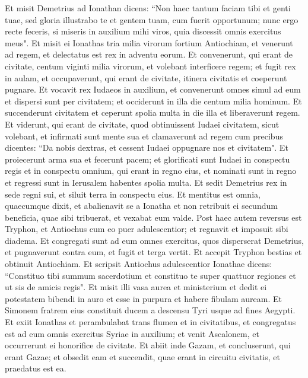 \begin{biblechapter}
\verse Et misit Demetrius ad Ionathan dicens: “Non haec tantum faciam tibi et genti tuae, sed gloria illustrabo te et gentem tuam, cum fuerit opportunum; 
\verse nunc ergo recte feceris, si miseris in auxilium mihi viros, quia discessit omnis exercitus meus". 
\verse Et misit ei Ionathas tria milia virorum fortium Antiochiam, et venerunt ad regem, et delectatus est rex in adventu eorum. 
\verse Et convenerunt, qui erant de civitate, centum viginti milia virorum, et volebant interficere regem; 
\verse et fugit rex in aulam, et occupaverunt, qui erant de civitate, itinera civitatis et coeperunt pugnare. 
\verse Et vocavit rex Iudaeos in auxilium, et convenerunt omnes simul ad eum et dispersi sunt per civitatem; et occiderunt in illa die centum milia hominum. 
\verse Et succenderunt civitatem et ceperunt spolia multa in die illa et liberaverunt regem. 
\verse Et viderunt, qui erant de civitate, quod obtinuissent Iudaei civitatem, sicut volebant, et infirmati sunt mente sua et clamaverunt ad regem cum precibus dicentes: 
\verse “Da nobis dextras, et cessent Iudaei oppugnare nos et civitatem". 
\verse Et proiecerunt arma sua et fecerunt pacem; et glorificati sunt Iudaei in conspectu regis et in conspectu omnium, qui erant in regno eius, et nominati sunt in regno et regressi sunt in Ierusalem habentes spolia multa. 
\verse Et sedit Demetrius rex in sede regni sui, et siluit terra in conspectu eius. 
\verse Et mentitus est omnia, quaecumque dixit, et abalienavit se a Ionatha et non retribuit ei secundum beneficia, quae sibi tribuerat, et vexabat eum valde. 
\verse Post haec autem reversus est Tryphon, et Antiochus cum eo puer adulescentior; et regnavit et imposuit sibi diadema. 
\verse Et congregati sunt ad eum omnes exercitus, quos disperserat Demetrius, et pugnaverunt contra eum, et fugit et terga vertit. 
\verse Et accepit Tryphon bestias et obtinuit Antiochiam. 
\verse Et scripsit Antiochus adulescentior Ionathae dicens: “Constituo tibi summum sacerdotium et constituo te super quattuor regiones et ut sis de amicis regis".  
\verse Et misit illi vasa aurea et ministerium et dedit ei potestatem bibendi in auro et esse in purpura et habere fibulam auream. 
\verse Et Simonem fratrem eius constituit ducem a descensu Tyri usque ad fines Aegypti. 
\verse Et exiit Ionathas et perambulabat trans flumen et in civitatibus, et congregatus est ad eum omnis exercitus Syriae in auxilium; et venit Ascalonem, et occurrerunt ei honorifice de civitate. 
\verse Et abiit inde Gazam, et concluserunt, qui erant Gazae; et obsedit eam et succendit, quae erant in circuitu civitatis, et praedatus est ea. 

\end{biblechapter}
